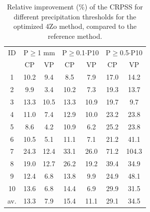 \documentclass[review]{elsarticle}
\begin{document}
\begin{table}[t]
	\caption{Relative improvement (\%) of the CRPSS for different precipitation thresholds for the optimized 4Zo method, compared to the reference method.}
	\footnotesize
	\begin{center}
		\begin{tabular}{ccccccc}
			\hline 
			ID & \multicolumn{2}{c}{P\(\geq\)1 mm} & \multicolumn{2}{c}{P\(\geq\)0.1\(\cdot\)P10} & \multicolumn{2}{c}{P\(\geq\)0.5\(\cdot\)P10} \\ 
			& CP & VP & CP & VP & CP & VP \\ 
			\hline 
			1 & 10.2 & 9.4 & 8.5 & 7.9 & 17.0 & 14.2 \\ 
			2 & 9.9 & 3.4 & 10.2 & 7.3 & 19.3 & 13.7 \\ 
			3 & 13.3 & 10.5 & 13.3 & 10.9 & 19.7 & 9.7 \\ 
			4 & 11.0 & 7.4 & 12.9 & 10.0 & 23.2 & 23.8 \\ 
			5 & 8.6 & 4.2 & 10.9 & 6.2 & 25.2 & 23.8 \\ 
			6 & 10.5 & 5.1 & 11.1 & 7.1 & 21.2 & 41.1 \\ 
			7 & 24.3 & 12.4 & 33.1 & 26.0 & 71.2 & 104.3 \\ 
			8 & 19.0 & 12.7 & 26.2 & 19.2 & 39.4 & 34.9 \\ 
			9 & 12.4 & 6.8 & 13.8 & 9.9 & 24.9 & 48.1 \\ 
			10 & 13.6 & 6.8 & 14.4 & 6.9 & 29.9 & 31.5 \\ 
			\hline 
			av. & 13.3 & 7.9 & 15.4 & 11.1 & 29.1 & 34.5 \\ 
			\hline 
		\end{tabular} 
	\end{center}
	\label{table:scores_thresholds_4Zo}
\end{table}
\end{document}
